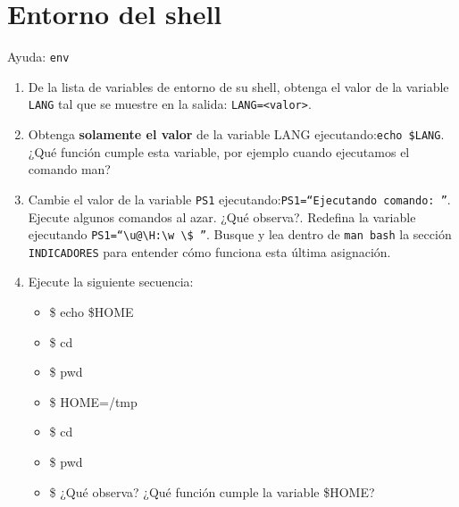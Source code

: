 \documentclass[12pt]{article}
\begin{document}
\section*{Entorno del shell}
Ayuda: \texttt{env}
\begin{enumerate}
\item De la lista de variables de entorno de su shell, obtenga el valor de la variable \texttt{LANG} tal que se muestre en la salida: \texttt{LANG=<valor>}. 

\item Obtenga \textbf{solamente el valor} de la variable LANG ejecutando:\texttt{echo \$LANG}. ¿Qué función cumple esta variable, por ejemplo cuando ejecutamos el comando man? 
\item Cambie el valor de la variable \texttt{PS1} ejecutando:\texttt{PS1=``Ejecutando comando: ''}. Ejecute algunos comandos al azar. ¿Qué observa?. Redefina la variable ejecutando \texttt{PS1=``\textbackslash u@\textbackslash H:\textbackslash w \textbackslash \$ ''}. Busque y lea dentro de \texttt{man bash} la sección \texttt{INDICADORES} para entender cómo funciona esta última asignación.
\item Ejecute la siguiente secuencia:
	\begin{itemize}
	\item \$ echo \$HOME
	\item \$ cd 
	\item \$ pwd
	\item \$ HOME=/tmp
	\item \$ cd 
	\item \$ pwd
	\item \$ ¿Qué observa? ¿Qué función cumple la variable \$HOME?
	\end{itemize}
\end{enumerate}
\end{document}
